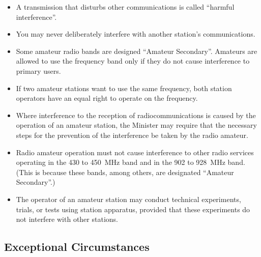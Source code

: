 \documentclass[letterpaper,12pt]{scrartcl}
\begin{document}
\begin{itemize}
\item A transmission that disturbs other communications is called ``harmful interference''.
\item You may never deliberately interfere with another station's communications.
\item Some amateur radio bands are designed ``Amateur Secondary''. Amateurs are allowed to use the frequency band only if they do not cause interference to primary users.
\item If two amateur stations want to use the same frequency, both station operators have an equal right to operate on the frequency.
\item Where interference to the reception of radiocommunications is caused by the operation of an amateur station,
the Minister may require that the necessary steps for the prevention of the interference be taken by the radio amateur.
\item Radio amateur operation must not cause interference to other radio services operating in the 430 to 450~MHz band and in the 902 to 928~MHz band.
(This is because these bands, among others, are designated ``Amateur Secondary''.)
\item The operator of an amateur station may conduct technical experiments, trials, or tests using station apparatus, provided that these experiments do not interfere with other stations.
\end{itemize}

\subsection{Exceptional Circumstances}
\end{document}
